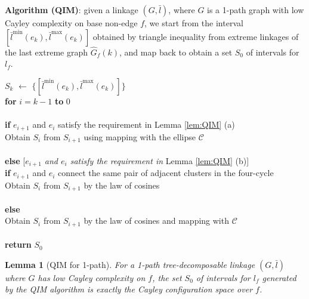 \documentclass[secthm,amsthm,english]{article}
\newtheorem{lemma}{Lemma}
\theoremstyle{definition}
\theoremstyle{remark}
\begin{document}
\noindent\textbf{Algorithm (QIM)}: 
given a linkage $(G, \bar{l})$, where $G$ is a 1-path graph with low Cayley complexity on base non-edge $f$, 
we start from the interval $[\bar{l}^{\min}(e_k),\bar{l}^{\max}(e_k)]$ obtained by triangle inequality from extreme linkages of the last extreme graph $\hat{G}_f(k)$, and map back to obtain a set $S_0$ of intervals for $l_f$. 

\smallskip

\indent $S_{k}$ $\leftarrow$ $\{[\bar{l}^{\min}(e_k),\bar{l}^{\max}(e_k)]\}$ \\
\indent \textbf{for} $i = k-1$ \textbf{to} $0$ \hspace{10pt} \\
\indent {}\\
\indent \indent \textbf{if} $e_{i+1}$ and $e_i$ satisfy the requirement in Lemma \ref{lem:QIM} (a) \\
\indent \indent \indent Obtain $S_{i}$ from $S_{i+1}$ using mapping with the ellipse $\mathcal{C}$  \\
\indent \indent {} \\
\indent \indent \textbf{else} \hspace{10pt} [\textit{$e_{i+1}$ and $e_i$ satisfy the requirement in} Lemma \ref{lem:QIM} (b)] \\
\indent \indent \indent \textbf{if} $e_{i+1}$ and $e_i$ connect the same pair of adjacent clusters in the four-cycle \\
\indent \indent \indent \indent Obtain $S_{i}$ from $S_{i+1}$ by the law of cosines \\
\indent \indent \indent {} \\
\indent \indent \indent \textbf{else}\\ \indent\indent\indent\indent Obtain $S_{i}$ from $S_{i+1}$ by the law of cosines and mapping with $\mathcal{C}$ \\
\indent \indent \indent {} \\
\indent \textbf{return} $S_0$










\begin{lemma}[QIM for 1-path] \label{lem:QIM-1-path}
For a 1-path tree-decomposable linkage $(G,\bar{l})$ where $G$ has low Cayley complexity on $f$, the set $S_0$ of intervals for $l_f$ generated by the QIM algorithm is exactly the Cayley configuration space over $f$. 
\end{lemma}
\end{document}
